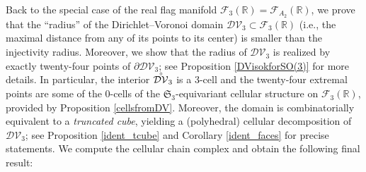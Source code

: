 \documentclass[11pt,twoside]{amsart}
\theoremstyle{plain}
\newcommand{\R}{{\mathbb R}}
\newcommand{\Sym}{\mathfrak{S}}
\newcommand{\interior}[1]{\accentset{\circ}{#1}}
\begin{document}
Back to the special case of the real flag manifold $\mathcal{F}_3(\R)=\mathcal{F}_{A_2}(\R)$, we prove that the ``radius'' of the Dirichlet--Voronoi domain $\mathcal{DV}_3\subset\mathcal{F}_3(\R)$ (i.e., the maximal distance from any of its points to its center) is smaller than the injectivity radius. Moreover, we show that the radius of $\mathcal{DV}_3$ is realized by exactly twenty-four points of $\partial\mathcal{DV}_3$; see Proposition \ref{DVisokforSO(3)} for more details. In particular, the interior $\interior{\mathcal{DV}}_3$ is a 3-cell and the twenty-four extremal points are some of the $0$-cells of the $\Sym_3$-equivariant cellular structure on $\mathcal{F}_3(\R)$, provided by Proposition \ref{cellsfromDV}. Moreover, the domain is combinatorially equivalent to a \emph{truncated cube}, yielding a (polyhedral) cellular decomposition of $\mathcal{DV}_3$; see Proposition \ref{ident_tcube} and Corollary \ref{ident_faces} for precise statements. We compute the cellular chain complex and obtain the following final result:
\end{document}
